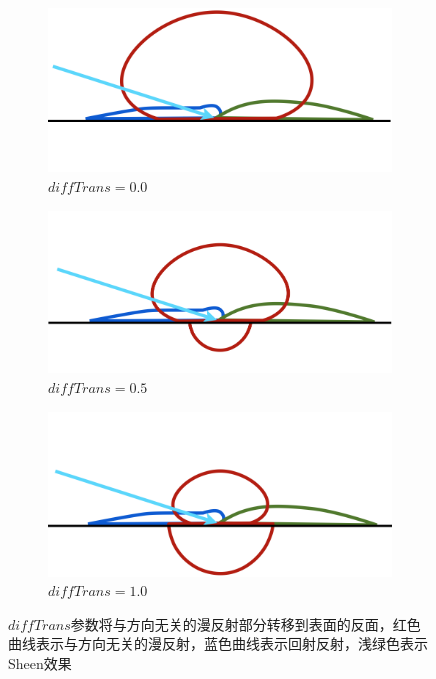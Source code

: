 \begin{figure}
	\begin{subfigure}[b]{0.325\textwidth}
		\includegraphics[width=1.\textwidth]{figures/intro/thin-diffuse-1}
		\caption{$diffTrans=0.0$}
	\end{subfigure}
	\begin{subfigure}[b]{0.325\textwidth}
		\includegraphics[width=1.\textwidth]{figures/intro/thin-diffuse-2}
		\caption{$diffTrans=0.5$}
	\end{subfigure}
	\begin{subfigure}[b]{0.325\textwidth}
		\includegraphics[width=1.\textwidth]{figures/intro/thin-diffuse-3}
		\caption{$diffTrans=1.0$}
	\end{subfigure}
\caption{$diffTrans$参数将与方向无关的漫反射部分转移到表面的反面，红色曲线表示与方向无关的漫反射，蓝色曲线表示回射反射，浅绿色表示Sheen效果}
\label{f:intro-thin-diffuse}
\end{figure}

